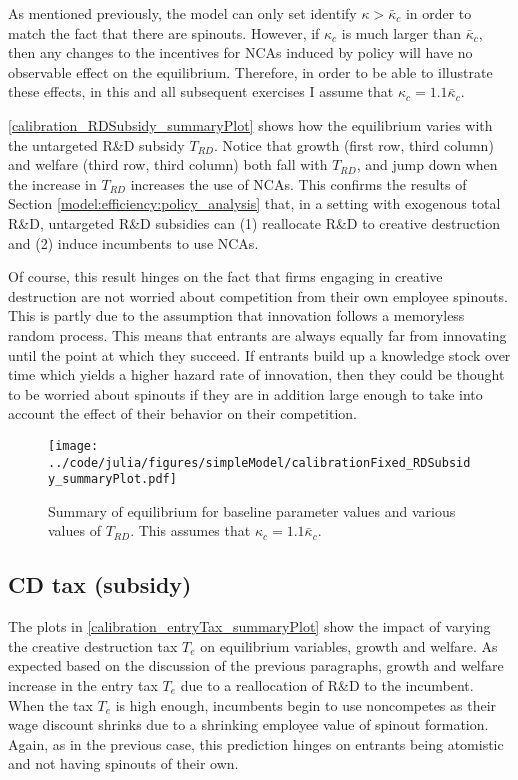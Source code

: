 \documentclass[11pt,english]{article}
\begin{document}
As mentioned previously, the model can only set identify $\kappa > \bar{\kappa}_c$ in order to match the fact that there are spinouts. However, if $\kappa_c$ is much larger than $\bar{\kappa}_c$, then any changes to the incentives for NCAs induced by policy will have no observable effect on the equilibrium. Therefore, in order to be able to illustrate these effects, in this and all subsequent exercises I assume that $\kappa_c = 1.1 \bar{\kappa}_c$. 

\autoref{calibration_RDSubsidy_summaryPlot} shows how the equilibrium varies with the untargeted R\&D subsidy $T_{RD}$. Notice that growth (first row, third column) and welfare (third row, third column) both fall with $T_{RD}$, and jump down when the increase in $T_{RD}$ increases the use of NCAs. This confirms the results of Section \ref{model:efficiency:policy_analysis} that, in a setting with exogenous total R\&D, untargeted R\&D subsidies can (1) reallocate R\&D to creative destruction and (2) induce incumbents to use NCAs.

Of course, this result hinges on the fact that firms engaging in creative destruction are not worried about competition from their own employee spinouts. This is partly due to the assumption that innovation follows a memoryless random process. This means that entrants are always equally far from innovating until the point at which they succeed. If entrants build up a knowledge stock over time which yields a higher hazard rate of innovation, then they could be thought to be worried about spinouts if they are in addition large enough to take into account the effect of their behavior on their competition. 

\begin{figure}[]
	\texttt{[image: ../code/julia/figures/simpleModel/calibrationFixed\_RDSubsidy\_summaryPlot.pdf]}
	\caption{Summary of equilibrium for baseline parameter values and various values of $T_{RD}$. This assumes that $\kappa_c = 1.1 \bar{\kappa}_c$.}
	\label{calibration_RDSubsidy_summaryPlot}
\end{figure}

\subsection{CD tax (subsidy)}\label{subsec:cd_tax}

The plots in \autoref{calibration_entryTax_summaryPlot} show the impact of varying the creative destruction tax $T_e$ on equilibrium variables, growth and welfare. As expected based on the discussion of the previous paragraphs, growth and welfare increase in the entry tax $T_e$ due to a reallocation of R\&D to the incumbent. When the tax $T_e$ is high enough, incumbents begin to use noncompetes as their wage discount shrinks due to a shrinking employee value of spinout formation. Again, as in the previous case, this prediction hinges on entrants being atomistic and not having spinouts of their own. 
\end{document}
